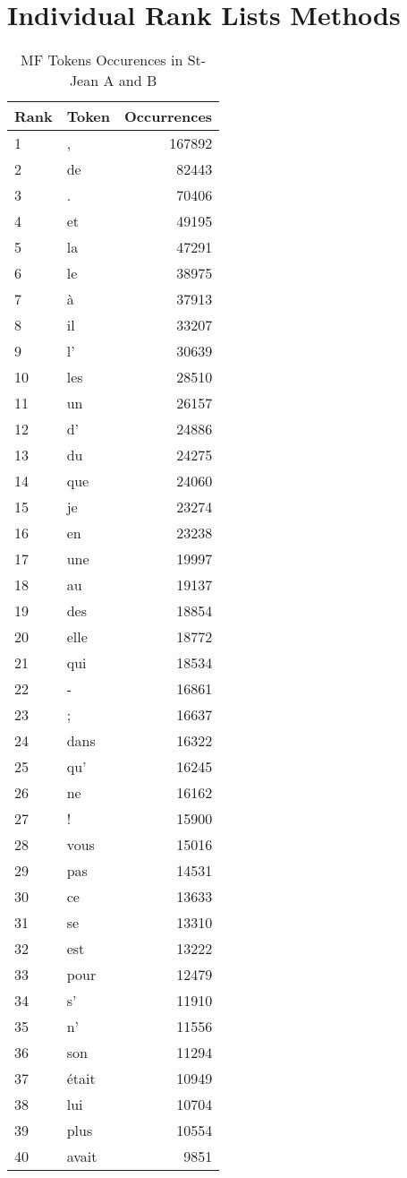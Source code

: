 \section{Individual Rank Lists Methods}
\twocolumn
\begin{table}
  \centering
  \caption{MF Tokens Occurences in St-Jean A and B}
  \label{tab:tokens_occurences_st_jean}
  \begin{tabular}{l l r}
    \toprule
    Rank & Token & Occurrences \\
    \midrule
    1 & , & 167892 \\
    2 & de & 82443 \\
    3 & . & 70406 \\
    4 & et & 49195 \\
    5 & la & 47291 \\
    6 & le & 38975 \\
    7 & à & 37913 \\
    8 & il & 33207 \\
    9 & l' & 30639 \\
    10 & les & 28510 \\
    11 & un & 26157 \\
    12 & d' & 24886 \\
    13 & du & 24275 \\
    14 & que & 24060 \\
    15 & je & 23274 \\
    16 & en & 23238 \\
    17 & une & 19997 \\
    18 & au & 19137 \\
    19 & des & 18854 \\
    20 & elle & 18772 \\
    21 & qui & 18534 \\
    22 & - & 16861 \\
    23 & ; & 16637 \\
    24 & dans & 16322 \\
    25 & qu' & 16245 \\
    26 & ne & 16162 \\
    27 & ! & 15900 \\
    28 & vous & 15016 \\
    29 & pas & 14531 \\
    30 & ce & 13633 \\
    31 & se & 13310 \\
    32 & est & 13222 \\
    33 & pour & 12479 \\
    34 & s' & 11910 \\
    35 & n' & 11556 \\
    36 & son & 11294 \\
    37 & était & 10949 \\
    38 & lui & 10704 \\
    39 & plus & 10554 \\
    40 & avait & 9851 \\
    \bottomrule
  \end{tabular}
\end{table}

